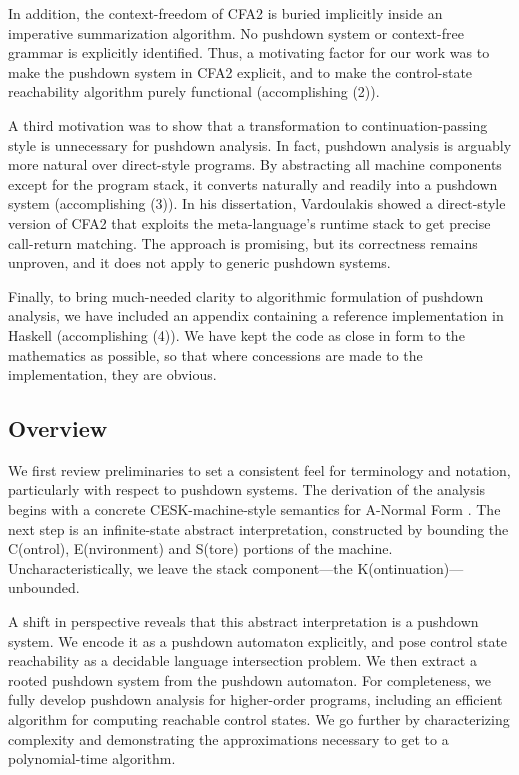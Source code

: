 In addition, the context-freedom of CFA2 is buried implicitly
inside an imperative summarization algorithm.
No pushdown system or context-free grammar is explicitly identified.
Thus, a motivating factor for our work was to make 
the pushdown system in CFA2 explicit, and to make the control-state
reachability algorithm purely functional (accomplishing (2)).


A third motivation was to show that a transformation to continuation-passing
style is unnecessary for pushdown analysis.
In fact, pushdown analysis is arguably more natural over direct-style programs.
By abstracting all machine components except for the program stack, 
it converts naturally and readily into a pushdown system (accomplishing (3)).
In his dissertation, Vardoulakis showed a direct-style version of CFA2 that exploits the meta-language's runtime stack to get precise call-return matching.
The approach is promising, but its correctness remains unproven, and it does not apply to generic pushdown systems.


Finally, to bring much-needed clarity to algorithmic formulation of
pushdown analysis, we have included an appendix containing a reference
implementation in Haskell (accomplishing (4)).
We have kept the code as close in form to the mathematics as possible, so that
where concessions are made to the implementation, they are obvious.



\subsection{Overview}
We first review preliminaries to set a consistent feel for
terminology and notation, particularly with respect
to pushdown systems.
The derivation of the analysis 
begins with a concrete CESK-machine-style semantics for
A-Normal Form \lc{}.
The next step is an infinite-state abstract interpretation, 
constructed by
bounding the C(ontrol), E(nvironment) and S(tore) portions of the machine.
Uncharacteristically,
we leave the stack component---the K(ontinuation)---unbounded.

A shift in perspective reveals that this abstract interpretation is a pushdown
system.
We encode it as a pushdown automaton explicitly, and pose control state
reachability as a decidable language intersection problem.
We then extract a rooted pushdown system from the pushdown automaton.
For completeness, we fully develop pushdown analysis for higher-order programs,
including an efficient algorithm for computing reachable control states.
We go further by characterizing complexity and demonstrating the approximations
necessary to get to a polynomial-time algorithm.




